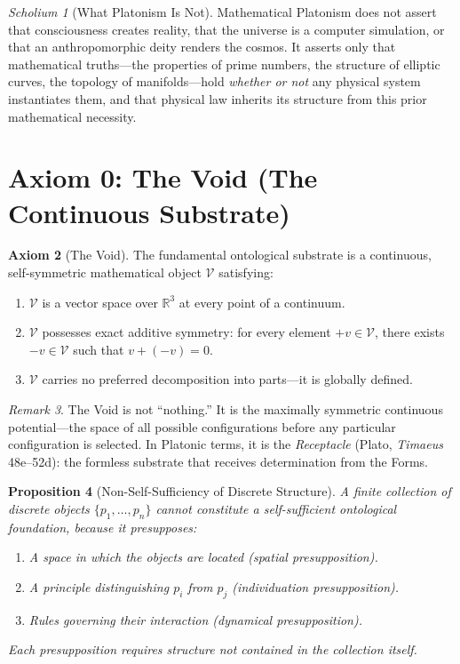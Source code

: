 \documentclass[11pt,twoside]{article}
\theoremstyle{definition}
\newtheorem{axiom}{Axiom}
\theoremstyle{plain}
\newtheorem{proposition}[axiom]{Proposition}
\theoremstyle{remark}
\newtheorem{remark}[axiom]{Remark}
\newtheorem{scholium}[axiom]{Scholium}
\newcommand{\Void}{\mathcal{V}}
\newcommand{\Real}{\mathbb{R}}
\begin{document}
\begin{scholium}[What Platonism Is Not]
Mathematical Platonism does not assert that consciousness creates reality, that the universe is a computer simulation, or that an anthropomorphic deity renders the cosmos. It asserts only that mathematical truths---the properties of prime numbers, the structure of elliptic curves, the topology of manifolds---hold \emph{whether or not} any physical system instantiates them, and that physical law inherits its structure from this prior mathematical necessity.
\end{scholium}

\section{Axiom 0: The Void (The Continuous Substrate)}

\begin{axiom}[The Void]\label{ax:void}
The fundamental ontological substrate is a continuous, self-symmetric mathematical object $\Void$ satisfying:
\begin{enumerate}[label=(\roman*), nosep]
    \item $\Void$ is a vector space over $\Real^3$ at every point of a continuum.
    \item $\Void$ possesses exact additive symmetry: for every element $+v \in \Void$, there exists $-v \in \Void$ such that $v + (-v) = 0$.
    \item $\Void$ carries no preferred decomposition into parts---it is globally defined.
\end{enumerate}
\end{axiom}

\begin{remark}
The Void is not ``nothing.'' It is the maximally symmetric continuous potential---the space of all possible configurations before any particular configuration is selected. In Platonic terms, it is the \emph{Receptacle} (Plato, \emph{Timaeus} 48e--52d): the formless substrate that receives determination from the Forms.
\end{remark}

\begin{proposition}[Non-Self-Sufficiency of Discrete Structure]\label{prop:discrete}
A finite collection of discrete objects $\{p_1, \ldots, p_n\}$ cannot constitute a self-sufficient ontological foundation, because it presupposes:
\begin{enumerate}[label=(\roman*), nosep]
    \item A space in which the objects are located (spatial presupposition).
    \item A principle distinguishing $p_i$ from $p_j$ (individuation presupposition).
    \item Rules governing their interaction (dynamical presupposition).
\end{enumerate}
Each presupposition requires structure not contained in the collection itself.
\end{proposition}
\end{document}
